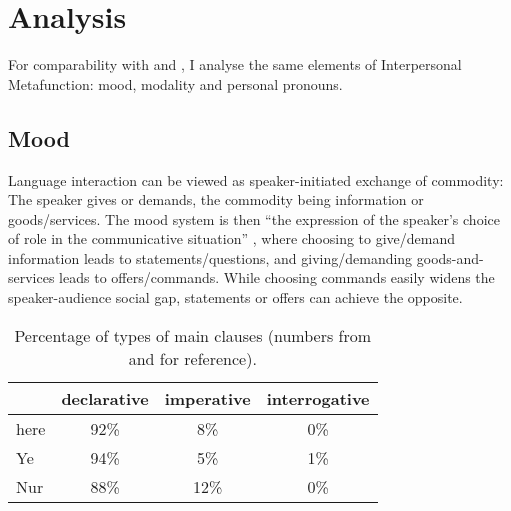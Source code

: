 \documentclass[11pt]{article}
\begin{document}
\section{Analysis}{
	For comparability with \citeauthor{Nur} and \citeauthor{Ye}, I analyse the same elements of Interpersonal Metafunction: mood, modality and personal pronouns.
 	
 	\subsection{Mood}{
 		Language interaction can be viewed as speaker-initiated exchange of commodity: The speaker gives or demands, the commodity being information or goods/services.
 		The mood system is then ``the expression of the speaker's choice of role in the communicative situation'' \citep{Halliday1970ModalityMood}, where choosing to give/demand information leads to statements/questions, and giving/demanding goods-and-services leads to offers/commands. While choosing commands easily widens the speaker-audience social gap, statements or offers can achieve the opposite.

		\begin{table}[h!tb]
	      \centering
			\begin{tabular}{l|ccc}
			         & declarative & imperative & interrogative \\
			  \hline
			  \hline
			  here   & 92\%        & 8\%        & 0\% \\
			  \hline
			  Ye     & 94\%        & 5\%        & 1\% \\
			  Nur    & 88\%        & 12\%       & 0\% \\
			\end{tabular}
	      \caption{Percentage of types of main clauses (numbers from \citeauthor{Ye} and \citeauthor{Nur} for reference).}
	      \label{tab:mood}
	    \end{table}

}}
\end{document}
